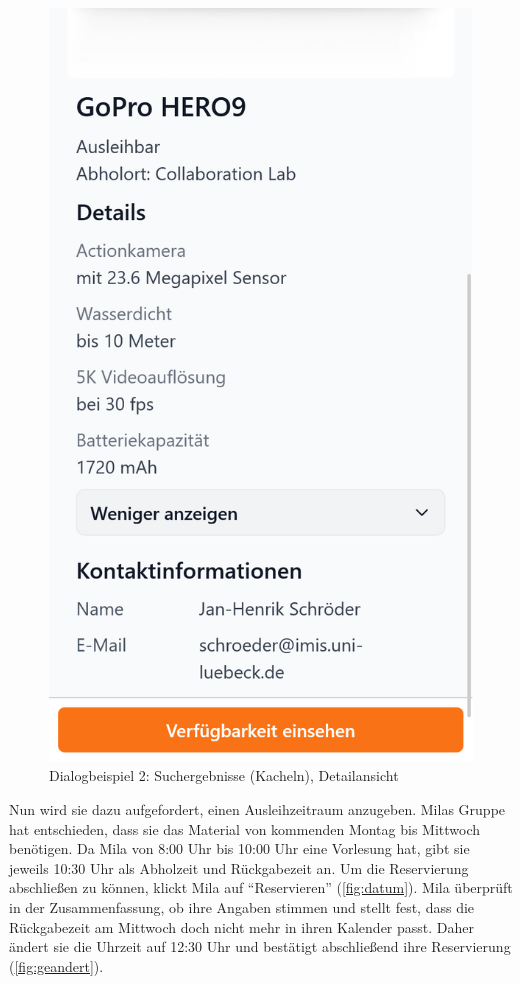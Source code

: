 \begin{figure}[p]
    \includegraphics[scale=0.17]{Bilder/Dialgobeispiel/Details 2.png}
    \caption{Dialogbeispiel 2: Suchergebnisse (Kacheln), Detailansicht}\label{fig:suchen}
\end{figure}

\newpage
Nun wird sie dazu aufgefordert, einen Ausleihzeitraum anzugeben. Milas Gruppe hat entschieden, dass
sie das Material von kommenden Montag bis Mittwoch benötigen. Da Mila von 8:00 Uhr bis 10:00 Uhr eine Vorlesung
hat, gibt sie jeweils 10:30 Uhr als Abholzeit und Rückgabezeit an. Um die Reservierung abschließen zu
können, klickt Mila auf \enquote{Reservieren} (\ref{fig:datum}). Mila überprüft in der
Zusammenfassung, ob ihre Angaben stimmen und stellt fest, dass die Rückgabezeit am Mittwoch doch
nicht mehr in ihren Kalender passt. Daher ändert sie die Uhrzeit auf 12:30 Uhr und bestätigt
abschließend ihre Reservierung (\ref{fig:geandert}).

